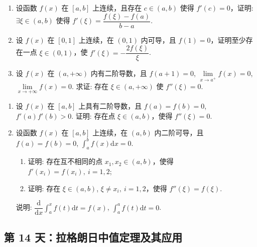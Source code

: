 \begin{enumerate}[label=\textbf{\arabic*.}, itemsep=7cm, resume]

    \item 设函数 $f(x)$ 在 $[a,b]$ 上连续，且存在 $c \in (a,b)$ 使得 $f'(c) = 0$，证明: $\exists \xi \in (a,b)$ 使得 $f'(\xi) = \dfrac{f(\xi) - f(a)}{b - a}$.

    \item 设 $f(x)$ 在 $[0,1]$ 上连续，在 $(0,1)$ 内可导，且 $f(1) = 0$，证明至少存在一点 $\xi \in (0,1)$，使 $f'(\xi) = -\dfrac{2f(\xi)}{\xi}$.
    
    \item 设 $f(x)$ 在 $(a,+\infty)$ 内有二阶导数，且 $f(a+1) = 0$, $\lim\limits_{x \to a^+} f(x) = 0$, $\lim\limits_{x \to +\infty} f(x) = 0$. 求证: 存在 $\xi \in (a,+\infty)$ 使 $f''(\xi) = 0$.
    
\end{enumerate}
\newpage
\begin{enumerate}[label=\textbf{\arabic*.}, itemsep=10cm, resume]

    \item 设 $f(x)$ 在 $[a,b]$ 上具有二阶导数，且 $f(a) = f(b) = 0$, $f'(a)f'(b) > 0$. 证明: 存在点 $\xi \in (a,b)$，使得 $f''(\xi) = 0$.
    
    \item 设函数 $f(x)$ 在 $[a,b]$ 上连续，在 $(a,b)$ 内二阶可导，且 $f(a) = f(b) = 0$, $\displaystyle \int_a^b f(x)\mathrm{d}x = 0$.
    \begin{enumerate}[label=(\arabic*)]
        \item 证明: 存在互不相同的点 $x_1, x_2 \in (a,b)$，使得 $f'(x_i) = f(x_i), \ i=1,2$;
        \item 证明: 存在 $\xi \in (a,b)$, $\xi \ne x_i, \ i=1,2$，使得 $f''(\xi) = f(\xi)$.
    \end{enumerate}
    说明: $\dfrac{\mathrm{d}}{\mathrm{d}x}\displaystyle \int_a^x f(t)\mathrm{d}t = f(x)$, $\displaystyle \int_a^a f(t)\mathrm{d}t = 0$.
\end{enumerate}

\newpage

\subsection*{第 14 天：拉格朗日中值定理及其应用}
\vspace{1cm}

